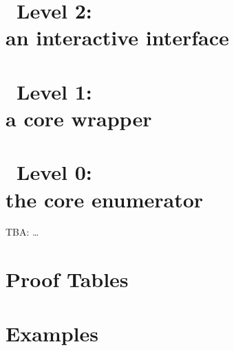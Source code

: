 \documentclass[12pt,a4paper,twoside]{repcram}
\begin{document}

\chapter{\ace\ Level 2: \\ an interactive interface}



\chapter{\ace\ Level 1: \\ a core wrapper}



\chapter{\ace\ Level 0: \\ the core enumerator}
%

TBA: \dots


\chapter{Proof Tables}



% 
% 


\clearpage
\appendix

\chapter{Examples}\label{app:ex}



\clearpage




\end{document}
